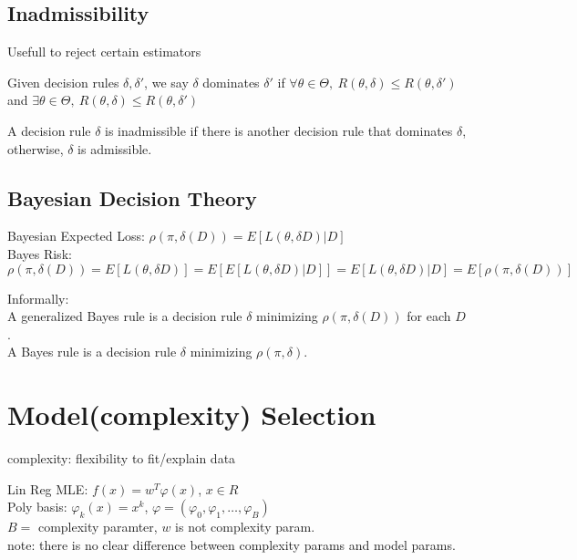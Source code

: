 \documentclass{article}
\begin{document}
\subsection{Inadmissibility}
Usefull to reject certain estimators

\begin{definition}
Given decision rules $\delta, \delta'$, we say $\delta$ dominates $\delta'$ 
if $\forall \theta \in \Theta,\ R(\theta, \delta) \leq R(\theta, \delta')$
and $\exists \theta \in \Theta,\ R(\theta, \delta) \le R(\theta, \delta')$
\end{definition}

\begin{definition}
A decision rule $\delta$ is inadmissible if there is another decision rule that dominates $\delta$, otherwise, $\delta$ is admissible.
\end{definition}

\subsection{Bayesian Decision Theory}
\noindent
Bayesian Expected Loss: $\rho(\pi, \delta(D)) = E[L(\theta, \delta{D}) | D]$\\
Bayes Risk: $\rho(\pi, \delta(D)) = E[L(\theta, \delta{D})] = E[E[L(\theta, \delta{D}) | D]] = E[L(\theta, \delta{D})|D] = E[\rho(\pi, \delta(D))]$

Informally:\\
A generalized Bayes rule is a decision rule $\delta$ minimizing $\rho(\pi, \delta(D))$ for each $D$.\\
A Bayes rule is a decision rule $\delta$ minimizing $\rho(\pi, \delta)$.

\section{Model(complexity) Selection}
complexity: flexibility to fit/explain data

\begin{example}
Lin Reg MLE: $f(x) = w^T \varphi(x)$, $x \in R$\\
Poly basis: $\varphi_k(x) = x^k$, $\varphi = (\varphi_0, \varphi_1, \ldots, \varphi_B)$\\
$B = $ complexity paramter, $w$ is not complexity param.\\
note: there is no clear difference between complexity params and model params.
\end{example}
\end{document}
